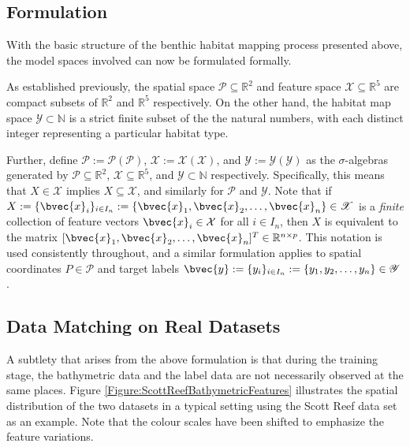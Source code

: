 		\subsection{Formulation}
		
			With the basic structure of the benthic habitat mapping process presented above, the model spaces involved can now be formulated formally.
			
			As established previously, the spatial space $\mathcal{P} \subseteq \mathbb{R}^{2}$ and feature space $\mathcal{X} \subseteq \mathbb{R}^{5}$ are compact subsets of $\mathbb{R}^{2}$ and $\mathbb{R}^{5}$ respectively. On the other hand, the habitat map space $\mathcal{Y} \subset \mathbb{N}$ is a strict finite subset of the the natural numbers, with each distinct integer representing a particular habitat type.
			
			Further, define $\mathscr{P} := \mathscr{P}(\mathcal{P})$, $\mathscr{X} := \mathscr{X}(\mathcal{X})$, and $\mathscr{Y} := \mathscr{Y}(\mathcal{Y})$ as the $\sigma$-algebras generated by $\mathcal{P} \subseteq \mathbb{R}^{2}$, $\mathcal{X} \subseteq \mathbb{R}^{5}$, and $\mathcal{Y} \subset \mathbb{N}$ respectively. Specifically, this means that $X \in \mathscr{X}$ implies $X \subseteq \mathcal{X}$, and similarly for $\mathscr{P}$ and $\mathscr{Y}$. Note that if $X := \{\bvec{x}_{i}\}_{i \in I_{n}} := \{\bvec{x}_{1}, \bvec{x}_{2}, \dots, \bvec{x}_{n}\} \in \mathscr{X}$ is a \textit{finite} collection of feature vectors $\bvec{x}_{i} \in \mathcal{X}$ for all $i \in I_{n}$, then $X$ is equivalent to the matrix $[\bvec{x}_{1}, \bvec{x}_{2}, \dots, \bvec{x}_{n}]^{T} \in \mathbb{R}^{n \times p}$. This notation is used consistently throughout, and a similar formulation applies to spatial coordinates $P \in \mathscr{P}$ and target labels $\bvec{y} := \{y_{i}\}_{i \in I_{n}} := \{y_{1}, y_{2}, \dots, y_{n}\} \in \mathscr{Y}$.
			
		
		\subsection{Data Matching on Real Datasets}
		\label{BenthicHabitatMapping:BathymetricFeatures:DataMatching}
		
			A subtlety that arises from the above formulation is that during the training stage, the bathymetric data and the label data are not necessarily observed at the same places. Figure \ref{Figure:ScottReefBathymetricFeatures} illustrates the spatial distribution of the two datasets in a typical setting using the Scott Reef data set \citep{IMOS} as an example. Note that the colour scales have been shifted to emphasize the feature variations.
		
